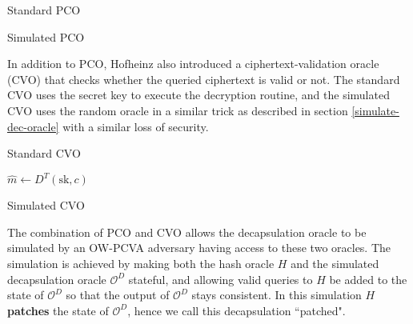 \documentclass{article}
\begin{document}
\begin{multicols}{2}
    \begin{algorithm}[H]
        \SetAlgoLined
        \caption{Standard PCO}
    \end{algorithm}

    \columnbreak
    \begin{algorithm}[H]
        \SetAlgoLined
        \caption{Simulated PCO}
    \end{algorithm}
\end{multicols}

In addition to PCO, Hofheinz \cite{hofheinz2017modular} also introduced a ciphertext-validation oracle (CVO) that checks whether the queried ciphertext is valid or not. The standard CVO uses the secret key to execute the decryption routine, and the simulated CVO uses the random oracle in a similar trick as described in section \ref{simulate-dec-oracle} with a similar loss of security.

\begin{multicols}{2}
    \begin{algorithm}[H]
        \SetAlgoLined
        \caption{Standard CVO}
        $\hat{m} \leftarrow D^T(\text{sk}, c)$\;
    \end{algorithm}
    \columnbreak

    \begin{algorithm}[H]
        \SetAlgoLined
        \caption{Simulated CVO}
    \end{algorithm}
\end{multicols}

The combination of PCO and CVO allows the decapsulation oracle to be simulated by an OW-PCVA adversary having access to these two oracles. The simulation is achieved by making both the hash oracle $H$ and the simulated decapsulation oracle $\mathcal{O}^D$ stateful, and allowing valid queries to $H$ be added to the state of $\mathcal{O}^D$ so that the output of $\mathcal{O}^D$ stays consistent. In this simulation $H$ \textbf{patches} the state of $\mathcal{O}^D$, hence we call this decapsulation ``patched".
\end{document}
